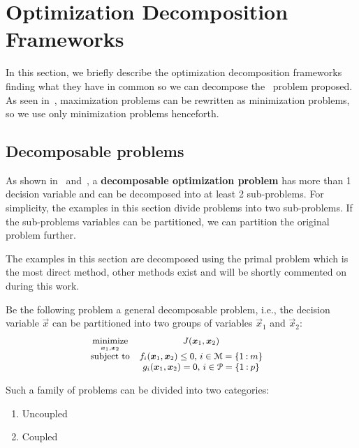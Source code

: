 \documentclass[../main.tex]{subfiles}
\begin{document}
\section{Optimization Decomposition Frameworks}\label{sec:decomp-fram}
In this section, we briefly describe the optimization decomposition frameworks finding what they have in common so we can decompose the \mpc\ problem proposed.
As seen in~\cite{BoydVandenberghe2004}, maximization problems can be rewritten as minimization problems, so we use only minimization problems henceforth.
\subsection{Decomposable problems}\label{sec:decomposable_problems}
As shown in~\cite{ConejoEtAl2006} and~\cite{BoydEtAl2015}, a \textbf{decomposable optimization problem} has more than 1 decision variable and can be decomposed into at least 2 sub-problems.
For simplicity, the examples in this section divide problems into two sub-problems.
If the sub-problems variables can be partitioned, we can partition the original problem further.

The examples in this section are decomposed using the primal problem which is the most direct method, other methods exist and will be shortly commented on during this work.

Be the following problem a general decomposable problem, i.e., the decision variable $\vec{x}$ can be partitioned into two groups of variables $\vec{x}_{1}$ and $\vec{x}_{2}$:
\begin{equation}\label{eq:general_decomposable_optimization_problem}
  \small
  \begin{aligned}
    \begin{matrix}
      \mathop{\textrm{minimize}}\limits_{\boldsymbol{x}_{1},\boldsymbol{x}_{2}}  &J(\boldsymbol{x}_{1},\boldsymbol{x}_{2})&\\
      \mathrm{subject~ to} &

           f_{i}(\boldsymbol{x}_{1},\boldsymbol{x}_{2}) \leq 0 \text{, } i\in\mathcal{M}=\{1\mathbin{:}m\}\\
          & g_{i}(\boldsymbol{x}_{1},\boldsymbol{x}_{2}) = 0\text{, } i\in\mathcal{P}=\{1\mathbin{:}p\}\\
    \end{matrix}
  \end{aligned}
\end{equation}

Such a family of problems can be divided into two categories:
\begin{enumerate}
  \item Uncoupled
  \item Coupled
\end{enumerate}
\end{document}
